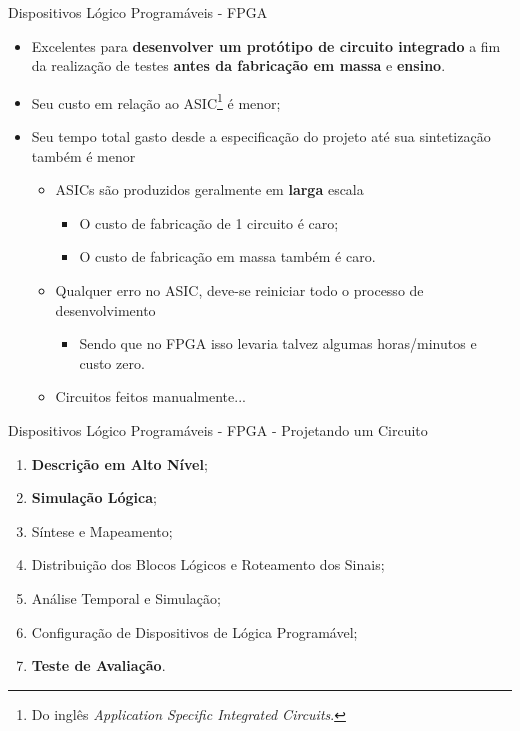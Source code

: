 \documentclass[aspectratio=169]{beamer}
\begin{document}
	\begin{frame}{Dispositivos Lógico Programáveis - FPGA}
		\begin{itemize}
			\setlength\itemsep{1.1em}
			
			\item Excelentes para \textbf{desenvolver um protótipo de circuito integrado} a fim da realização de testes \textbf{antes da fabricação em massa} \cite{Skliarova2003} e \textbf{ensino}.
			
			\item Seu custo em relação ao ASIC\footnote{Do inglês \textit{Application Specific Integrated Circuits}.} é menor;
			
			\item Seu tempo total gasto desde a especificação do projeto até sua sintetização também é menor
			\begin{itemize}
				\setlength\itemsep{0.5em}
				
				\item ASICs são produzidos geralmente em \textbf{larga} escala
				\begin{itemize}
					\item O custo de fabricação de 1 circuito é caro;
					\item O custo de fabricação em massa também é caro.
				\end{itemize}
				
				\item Qualquer erro no ASIC, deve-se reiniciar todo o processo de desenvolvimento
				\begin{itemize}
					\item Sendo que no FPGA isso levaria talvez algumas horas/minutos e custo zero.
				\end{itemize}
				
				\item Circuitos feitos manualmente...
			\end{itemize}
			
		\end{itemize}
	\end{frame}
	
	
	\begin{frame}{Dispositivos Lógico Programáveis - FPGA - Projetando um Circuito}
		\begin{enumerate}
			\setlength\itemsep{1em}
			\item \textbf{Descrição em Alto Nível};
			\item \textbf{Simulação Lógica};
			\pause
			\item Síntese e Mapeamento;
			\item Distribuição dos Blocos Lógicos e Roteamento dos Sinais;
			\item Análise Temporal e Simulação;
			\pause
			\item Configuração de Dispositivos de Lógica Programável;
			\pause
			\item \textbf{Teste de Avaliação}.
		\end{enumerate}
	\end{frame}
	
\end{document}
